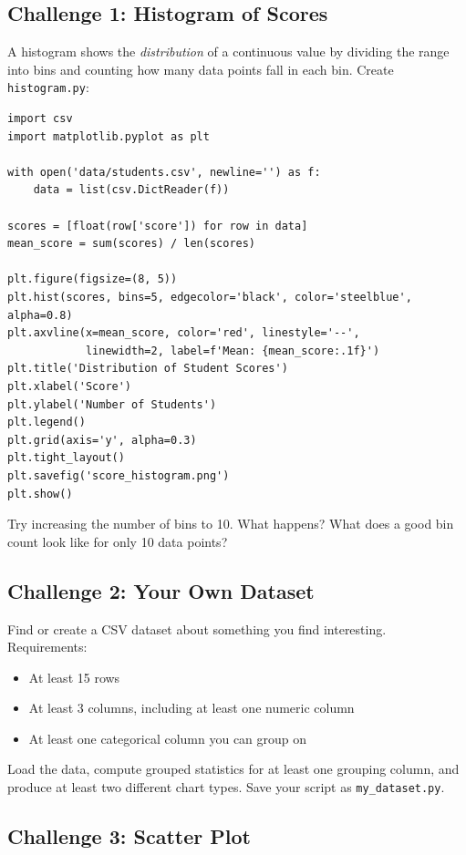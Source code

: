 \documentclass{cslab}
\begin{document}
\subsection*{Challenge 1: Histogram of Scores}

A histogram shows the \emph{distribution} of a continuous value by dividing the range into bins and counting how many data points fall in each bin. Create \texttt{histogram.py}:

\begin{lstlisting}
import csv
import matplotlib.pyplot as plt

with open('data/students.csv', newline='') as f:
    data = list(csv.DictReader(f))

scores = [float(row['score']) for row in data]
mean_score = sum(scores) / len(scores)

plt.figure(figsize=(8, 5))
plt.hist(scores, bins=5, edgecolor='black', color='steelblue', alpha=0.8)
plt.axvline(x=mean_score, color='red', linestyle='--',
            linewidth=2, label=f'Mean: {mean_score:.1f}')
plt.title('Distribution of Student Scores')
plt.xlabel('Score')
plt.ylabel('Number of Students')
plt.legend()
plt.grid(axis='y', alpha=0.3)
plt.tight_layout()
plt.savefig('score_histogram.png')
plt.show()
\end{lstlisting}

Try increasing the number of bins to 10. What happens? What does a good bin count look like for only 10 data points?

\subsection*{Challenge 2: Your Own Dataset}

Find or create a CSV dataset about something you find interesting. Requirements:
\begin{itemize}
    \item At least 15 rows
    \item At least 3 columns, including at least one numeric column
    \item At least one categorical column you can group on
\end{itemize}
Load the data, compute grouped statistics for at least one grouping column, and produce at least two different chart types. Save your script as \texttt{my\_dataset.py}.

\subsection*{Challenge 3: Scatter Plot}
\end{document}
